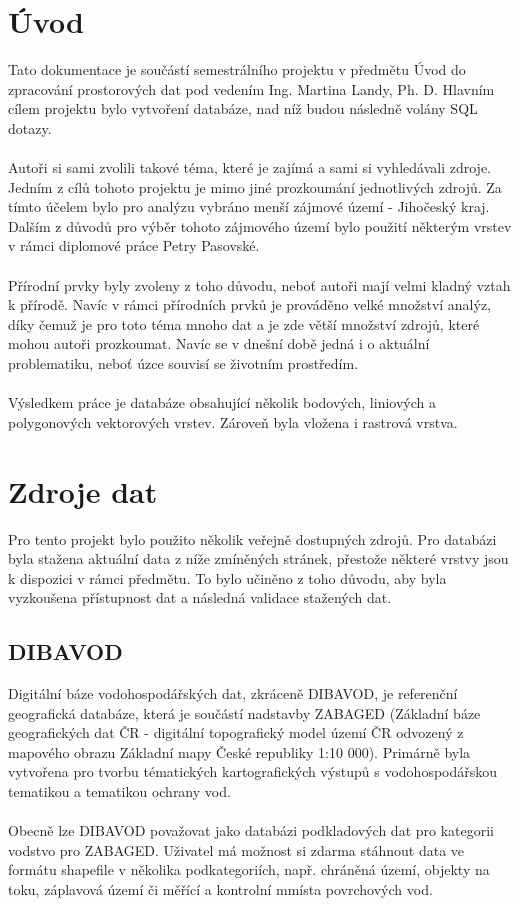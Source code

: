 \documentclass[a4paper, 12pt]{article}
\begin{document}
\section{Úvod}
Tato dokumentace je součástí semestrálního projektu v předmětu Úvod do zpracování prostorových dat pod vedením Ing. Martina Landy, Ph. D. Hlavním cílem projektu bylo vytvoření databáze, nad níž budou následně volány SQL dotazy.\\
\\
Autoři si sami zvolili takové téma, které je zajímá a sami si vyhledávali zdroje. Jedním z cílů tohoto projektu je mimo jiné prozkoumání jednotlivých zdrojů. Za tímto účelem bylo pro analýzu vybráno menší zájmové území - Jihočeský kraj. Dalším z důvodů pro výběr tohoto zájmového území bylo použití některým vrstev v rámci diplomové práce Petry Pasovské. \\
\\
Přírodní prvky byly zvoleny z toho důvodu, neboť autoři mají velmi kladný vztah k přírodě. Navíc v rámci přírodních prvků je prováděno velké množství analýz, díky čemuž je pro toto téma mnoho dat a je zde větší množství zdrojů, které mohou autoři prozkoumat. Navíc se v dnešní době jedná i o aktuální problematiku, neboť úzce souvisí se životním prostředím.\\
\\
Výsledkem práce je databáze obsahující několik bodových, liniových a polygonových vektorových vrstev. Zároveň byla vložena i rastrová vrstva.

\clearpage
\section{Zdroje dat}
Pro tento projekt bylo použito několik veřejně dostupných zdrojů. Pro databázi byla stažena aktuální data z níže zmíněných stránek, přestože některé vrstvy jsou k dispozici v rámci předmětu. To bylo učiněno z toho důvodu, aby byla vyzkoušena přístupnost dat a následná validace stažených dat. 

\subsection{DIBAVOD}
Digitální báze vodohospodářských dat, zkráceně DIBAVOD, je referenční geografická databáze, která je součástí nadstavby ZABAGED (Základní báze geografických dat ČR - digitální topografický model území ČR odvozený z mapového obrazu Základní mapy České republiky 1:10 000). Primárně byla vytvořena pro tvorbu tématických kartografických výstupů s vodohospodářskou tematikou a tematikou ochrany vod. \\
\\
Obecně lze DIBAVOD považovat jako databázi podkladových dat pro kategorii vodstvo pro ZABAGED. Uživatel má možnost si zdarma stáhnout data ve formátu shapefile v několika podkategoriích, např. chráněná území, objekty na toku, záplavová území či měřící a kontrolní mmísta povrchových vod. 
\end{document}
